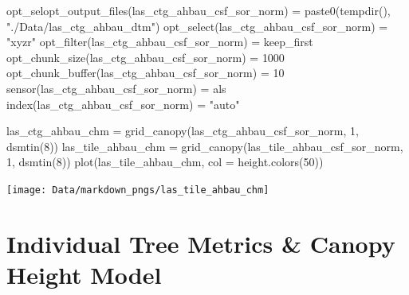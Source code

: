 \documentclass[
]{article}
\newenvironment{Shaded}{\begin{snugshade}}{\end{snugshade}}
\newcommand{\AttributeTok}[1]{\textcolor[rgb]{0.77,0.63,0.00}{#1}}
\newcommand{\DecValTok}[1]{\textcolor[rgb]{0.00,0.00,0.81}{#1}}
\newcommand{\FunctionTok}[1]{\textcolor[rgb]{0.00,0.00,0.00}{#1}}
\newcommand{\NormalTok}[1]{#1}
\newcommand{\OtherTok}[1]{\textcolor[rgb]{0.56,0.35,0.01}{#1}}
\newcommand{\StringTok}[1]{\textcolor[rgb]{0.31,0.60,0.02}{#1}}
\begin{document}
\begin{Shaded}
\begin{Highlighting}[]
\FunctionTok{opt\_selopt\_output\_files}\NormalTok{(las\_ctg\_ahbau\_csf\_sor\_norm) }\OtherTok{=} \FunctionTok{paste0}\NormalTok{(}\FunctionTok{tempdir}\NormalTok{(), }\StringTok{"./Data/las\_ctg\_ahbau\_dtm"}\NormalTok{)}
\FunctionTok{opt\_select}\NormalTok{(las\_ctg\_ahbau\_csf\_sor\_norm) }\OtherTok{=} \StringTok{"xyzr"}
\FunctionTok{opt\_filter}\NormalTok{(las\_ctg\_ahbau\_csf\_sor\_norm) }\OtherTok{=} \StringTok{\textquotesingle{}{-}keep\_first\textquotesingle{}} 
\FunctionTok{opt\_chunk\_size}\NormalTok{(las\_ctg\_ahbau\_csf\_sor\_norm) }\OtherTok{=} \DecValTok{1000} 
\FunctionTok{opt\_chunk\_buffer}\NormalTok{(las\_ctg\_ahbau\_csf\_sor\_norm) }\OtherTok{=} \DecValTok{10}
\FunctionTok{sensor}\NormalTok{(las\_ctg\_ahbau\_csf\_sor\_norm) }\OtherTok{=} \StringTok{\textquotesingle{}als\textquotesingle{}}
\FunctionTok{index}\NormalTok{(las\_ctg\_ahbau\_csf\_sor\_norm) }\OtherTok{=} \StringTok{"auto"}

\NormalTok{las\_ctg\_ahbau\_chm }\OtherTok{=} \FunctionTok{grid\_canopy}\NormalTok{(las\_ctg\_ahbau\_csf\_sor\_norm, }\DecValTok{1}\NormalTok{, }\FunctionTok{dsmtin}\NormalTok{(}\DecValTok{8}\NormalTok{))}
\NormalTok{las\_tile\_ahbau\_chm }\OtherTok{=} \FunctionTok{grid\_canopy}\NormalTok{(las\_tile\_ahbau\_csf\_sor\_norm, }\DecValTok{1}\NormalTok{, }\FunctionTok{dsmtin}\NormalTok{(}\DecValTok{8}\NormalTok{))}
\FunctionTok{plot}\NormalTok{(las\_tile\_ahbau\_chm, }\AttributeTok{col =} \FunctionTok{height.colors}\NormalTok{(}\DecValTok{50}\NormalTok{))}
\end{Highlighting}
\end{Shaded}

\texttt{[image: Data/markdown\_pngs/las\_tile\_ahbau\_chm]}

\hypertarget{individual-tree-metrics-canopy-height-model}{%
\section{Individual Tree Metrics \& Canopy Height
Model}\label{individual-tree-metrics-canopy-height-model}}
\end{document}
